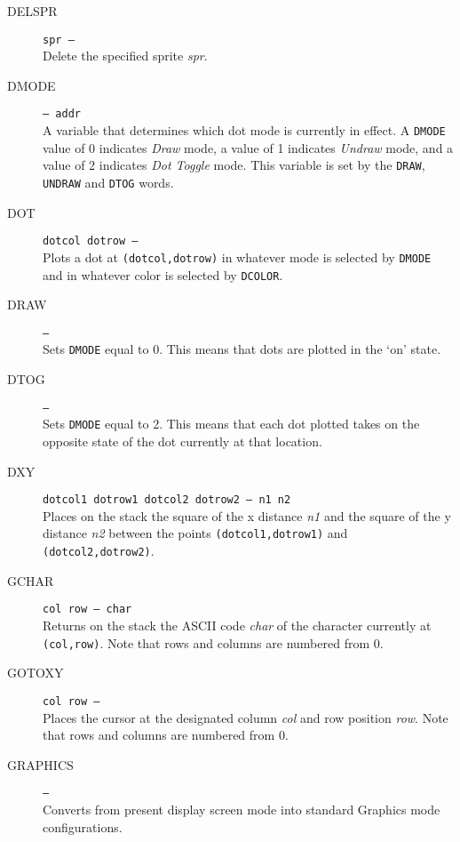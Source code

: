 \documentclass{article}
\begin{document}
\begin{multicols}{2}[]
\begin{description}
			\item[DELSPR]\texttt{spr --- }\\
				Delete the specified sprite \textit{spr}.

			\item[DMODE]\texttt{--- addr }\\
				A variable that determines which dot mode is currently in effect.
				A \verb|DMODE| value of 0 indicates \textit{Draw} mode, a value of 1
				indicates \textit{Undraw} mode, and a value of 2 indicates
				\textit{Dot Toggle} mode. This variable is set by the \verb|DRAW|,
				\verb|UNDRAW| and \verb|DTOG| words.

			\item[DOT]\texttt{dotcol dotrow --- }\\
				Plots a dot at \verb|(dotcol,dotrow)| in whatever mode is selected
				by \verb|DMODE| and in whatever color is selected by \verb|DCOLOR|.

			\item[DRAW]\texttt{--- }\\
				Sets \verb|DMODE| equal to 0. This means that dots are plotted in
				the `on' state.

			\item[DTOG]\texttt{--- }\\
				Sets \verb|DMODE| equal to 2. This means that each dot plotted
				takes on the opposite state of the dot currently at that location.

			\item[DXY]\texttt{dotcol1 dotrow1 dotcol2 dotrow2 --- n1 n2 }\\
				Places on the stack the square of the x distance \textit{n1} and
				the square of the y distance \textit{n2} between the points
				\verb|(dotcol1,dotrow1)| and \verb|(dotcol2,dotrow2)|.

			\item[GCHAR]\texttt{col row --- char }\\
				Returns on the stack the ASCII code \textit{char} of the character
				currently at \verb|(col,row)|. Note that rows and columns are
				numbered from 0.

			\item[GOTOXY]\texttt{col row --- }\\
				Places the cursor at the designated column \textit{col} and row
				position \textit{row}. Note that rows and columns are numbered
				from 0.

			\item[GRAPHICS]\texttt{--- }\\
				Converts from present display screen mode into standard Graphics mode
				configurations.


\end{description}
\end{multicols}
\end{document}
